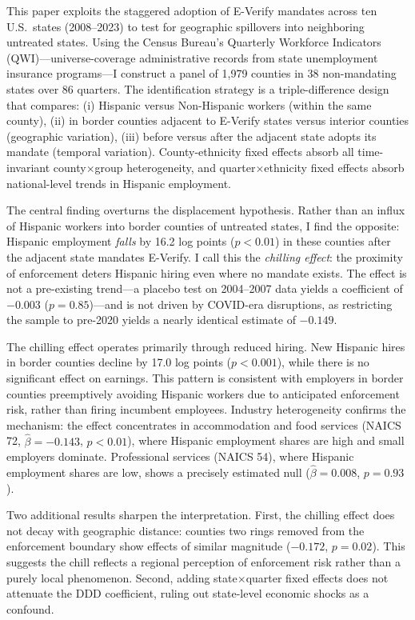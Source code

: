 \documentclass[12pt]{article}
\begin{document}
This paper exploits the staggered adoption of E-Verify mandates across ten U.S.\ states (2008--2023) to test for geographic spillovers into neighboring untreated states. Using the Census Bureau's Quarterly Workforce Indicators (QWI)---universe-coverage administrative records from state unemployment insurance programs---I construct a panel of 1,979 counties in 38 non-mandating states over 86 quarters. The identification strategy is a triple-difference design that compares: (i) Hispanic versus Non-Hispanic workers (within the same county), (ii) in border counties adjacent to E-Verify states versus interior counties (geographic variation), (iii) before versus after the adjacent state adopts its mandate (temporal variation). County-ethnicity fixed effects absorb all time-invariant county$\times$group heterogeneity, and quarter$\times$ethnicity fixed effects absorb national-level trends in Hispanic employment.

The central finding overturns the displacement hypothesis. Rather than an influx of Hispanic workers into border counties of untreated states, I find the opposite: Hispanic employment \textit{falls} by 16.2 log points ($p < 0.01$) in these counties after the adjacent state mandates E-Verify. I call this the \textit{chilling effect}: the proximity of enforcement deters Hispanic hiring even where no mandate exists. The effect is not a pre-existing trend---a placebo test on 2004--2007 data yields a coefficient of $-0.003$ ($p = 0.85$)---and is not driven by COVID-era disruptions, as restricting the sample to pre-2020 yields a nearly identical estimate of $-0.149$.

The chilling effect operates primarily through reduced hiring. New Hispanic hires in border counties decline by 17.0 log points ($p < 0.001$), while there is no significant effect on earnings. This pattern is consistent with employers in border counties preemptively avoiding Hispanic workers due to anticipated enforcement risk, rather than firing incumbent employees. Industry heterogeneity confirms the mechanism: the effect concentrates in accommodation and food services (NAICS 72, $\hat{\beta} = -0.143$, $p < 0.01$), where Hispanic employment shares are high and small employers dominate. Professional services (NAICS 54), where Hispanic employment shares are low, shows a precisely estimated null ($\hat{\beta} = 0.008$, $p = 0.93$).

Two additional results sharpen the interpretation. First, the chilling effect does not decay with geographic distance: counties two rings removed from the enforcement boundary show effects of similar magnitude ($-0.172$, $p = 0.02$). This suggests the chill reflects a regional perception of enforcement risk rather than a purely local phenomenon. Second, adding state$\times$quarter fixed effects does not attenuate the DDD coefficient, ruling out state-level economic shocks as a confound.
\end{document}
